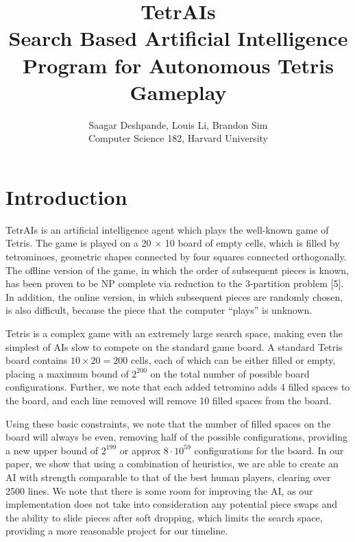 \documentclass[11pt]{article}
\title{\textbf{TetrAIs}\\ {\small Search Based Artificial Intelligence Program for Autonomous Tetris Gameplay}}
\author{Saagar Deshpande, Louis Li, Brandon Sim\\ {\small Computer Science 182, Harvard University}}
\begin{document}
\maketitle
\tableofcontents
\newpage

\section{Introduction}
TetrAIs is an artificial intelligence agent which plays the well-known game of Tetris. The game is played on a 20 $\times$ 10 board of empty cells, which is filled by tetrominoes, geometric shapes connected by four squares connected orthogonally. The offline version of the game, in which the order of subsequent pieces is known, has been proven to be NP complete via reduction to the 3-partition problem [5]. In addition, the online version, in which subsequent pieces are randomly chosen, is also difficult, because the piece that the computer ``plays'' is unknown.

Tetris is a complex game with an extremely large search space, making even the simplest of AIs slow to compete on the standard game board. A standard Tetris board contains $10\times 20 = 200$ cells, each of which can be either filled or empty, placing a maximum bound of $2^{200}$ on the total number of possible board configurations. Further, we note that each added tetromino adds 4 filled spaces to the board, and each line removed will remove 10 filled spaces from the board. 

Using these basic constraints, we note that the number of filled spaces on the board will always be even, removing half of the possible configurations, providing a new upper bound of $2^{199}$ or approx $8\cdot 10^{59}$ configurations for the board. In our paper, we show that using a combination of heuristics, we are able to create an AI with strength comparable to that of the best human players, clearing over 2500 lines. We note that there is some room for improving the AI, as our implementation does not take into consideration any potential piece swaps and the ability to slide pieces after soft dropping, which limits the search space, providing a more reasonable project for our timeline.
\end{document}
